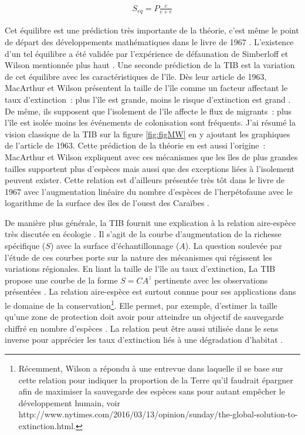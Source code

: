 \begin{eqnarray}
S_{eq} = P \frac{c}{c+e}
\end{eqnarray}

Cet équilibre est une prédiction très importante de la théorie, c'est
même le point de départ des développements mathématiques dans le livre
de 1967 \citep{MacArthur1967}. L'existence d'un tel équilibre a été
validée par l'expérience de défaunation de Simberloff et Wilson
mentionnée plus haut \citep{Simberloff1969}. Une seconde prédiction de
la TIB est la variation de cet équilibre avec les caractéristiques de
l'île. Dès leur article de 1963, MacArthur et Wilson présentent la
taille de l'île comme un facteur affectant le taux d'extinction~: plus
l'île est grande, moins le risque d'extinction est grand
\citep{MacArthur1963}. De même, ils supposent que l'isolement de l'île
affecte le flux de migrants~: plus l'île est isolée moins les événements
de colonisation sont fréquents. J'ai résumé la vision classique de la
TIB sur la figure \ref{fig:figMW} en y ajoutant les graphiques de
l'article de 1963. Cette prédiction de la théorie en est aussi
l'origine~: MacArthur et Wilson expliquent avec ces mécanismes que les
îles de plus grandes tailles supportent plus d'espèces mais aussi que
des exceptions liées à l'isolement peuvent exister. Cette relation est
d'ailleurs présentée très tôt dans le livre de 1967 avec l'augmentation
linéaire du nombre d'espèces de l'herpétofaune avec le logarithme de la
surface des îles de l'ouest des Caraïbes \citep[ chapitre
2]{MacArthur1967}.

De manière plus générale, la TIB fournit une explication à la relation
aire-espèce très discutée en écologie \citep{Lomolino2000a}. Il s'agit
de la courbe d'augmentation de la richesse spécifique (\(S\)) avec la
surface d'échantillonnage (\(A\)). La question soulevée par l'étude de
ces courbes porte sur la nature des mécanismes qui régissent les
variations régionales. En liant la taille de l'île au taux d'extinction,
La TIB propose une courbe de la forme \(S=CA^z\) pertinente avec les
observations présentées \citep{MacArthur1967}. La relation aire-espèce
est surtout connue pour ses applications dans le domaine de la
conservation\footnote{Récemment, Wilson a répondu à une entrevue dans
  laquelle il se base sur cette relation pour indiquer la proportion de
  la Terre qu'il faudrait épargner afin de maximiser la sauvegarde des
  espèces sans pour autant empêcher le développement humain, voir
  http://www.nytimes.com/2016/03/13/opinion/sunday/the-global-solution-to-extinction.html.}.
Elle permet, par exemple, d'estimer la taille qu'une zone de protection
doit avoir pour atteindre un objectif de sauvegarde chiffré en nombre
d'espèces \citep{Neigel2003, Desmet2004}. La relation peut être aussi
utilisée dans le sens inverse pour apprécier les taux d'extinction liés
à une dégradation d'habitat \citep{He2011}.

